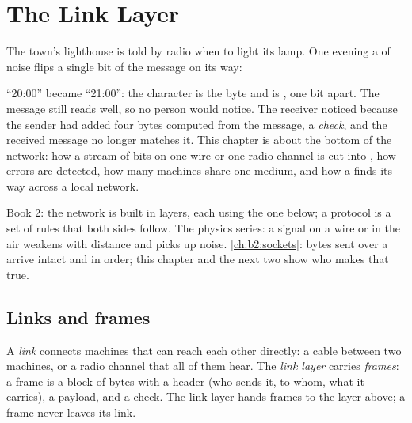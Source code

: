 \chapter{The Link Layer}\label{ch:b2:link-layer}

The town's lighthouse is told by radio when to light its lamp. One evening a  of noise flips a single bit of
the message on its way:

\label{out:b2:link-layer:hook}

``20:00'' became ``21:00'': the character  is the byte  and  is , one bit
apart. The message still reads well, so no person would notice. The receiver noticed because the sender had added
four bytes computed from the message, a \emph{check}, and the received message no longer matches it. This chapter is
about the bottom of the network: how a stream of bits on one wire or one radio channel is cut into , how errors
are detected, how many machines share one medium, and how a  finds its way across a local network.

\begin{recall}
Book 2: the network is built in layers, each using the one below; a protocol is a set of rules that both sides
follow. The physics series: a signal on a wire or in the air weakens with distance and picks up noise.
\cref{ch:b2:sockets}: bytes sent over a  arrive intact and in order; this chapter and the next two show who
makes that true.
\end{recall}

\section{Links and frames}\label{sec:b2:link-layer:frames}

\begin{definition}\label{def:b2:link-layer:frame}
A \emph{link} connects machines that can reach each other directly: a cable between two machines, or a
radio channel that all of them hear. The \emph{link layer} carries \emph{frames}: a
frame is a block of bytes with a header (who sends it, to whom, what it carries), a payload, and a check. The link
layer hands frames to the layer above; a frame never leaves its link.
\end{definition}

